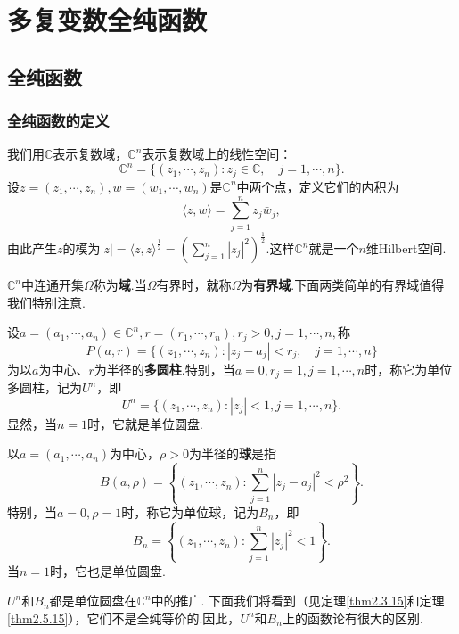 \chapter{多复变数全纯函数\label{chap1}}
\section{全纯函数\label{sec1.1}}
\subsection{全纯函数的定义}
我们用$\mathbb{C}$表示复数域，$\mathbb{C}^n$表示复数域上的线性空间：
\[\mathbb{C}^n=\{(z_1,\cdots,z_n)\colon z_j\in\mathbb{C},\quad j=1,\cdots,n\}.\]
设$z=(z_1,\cdots,z_n),w=(w_1,\cdots,w_n)$是$\mathbb{C}^n$中两个点，定义它们的内积为
\[\langle z,w \rangle =\sum_{j=1}^n z_j\bar{w}_j ,\]
由此产生$z$的模为$|z|=\langle z,z \rangle^{\frac12}=(\sum\limits_{j=1}^n |z_j|^2)^{\frac12}$.这样$\mathbb{C}^n$就是一个$n$维Hilbert空间.


$\mathbb{C}^n$中连通开集$\Omega$称为\textbf{域}.当$\Omega$有界时，就称$\Omega$为\textbf{有界域}.下面两类简单的有界域值得我们特别注意.


设$a=(a_1,\cdots,a_n)\in\mathbb{C}^n,r=(r_1,\cdots,r_n),r_j>0,j=1,\cdots,n,$称
\[P(a,r)=\{(z_1,\cdots,z_n)\colon |z_j-a_j|<r_j,\quad j=1,\cdots,n\}\]
为以$a$为中心、$r$为半径的\textbf{多圆柱}.特别，当$a=0,r_j=1,j=1,\cdots,n$时，称它为单位多圆柱，记为$U^n$，即
\[U^n=\{(z_1,\cdots,z_n)\colon |z_j|<1,j=1,\cdots,n\}.\]
显然，当$n=1$时，它就是单位圆盘.


以$a=(a_1,\cdots,a_n)$为中心，$\rho>0$为半径的\textbf{球}是指
\[B(a,\rho)=\left\{(z_1,\cdots,z_n)\colon\sum_{j=1}^{n}|z_j-a_j|^2 <\rho^2\right\}.\]
特别，当$a=0,\rho=1$时，称它为单位球，记为$B_n$，即
\[B_n=\left\{(z_1,\cdots,z_n)\colon \sum_{j=1}^n |z_j|^2 <1\right\}.\]
当$n=1$时，它也是单位圆盘.


$U^n$和$B_n$都是单位圆盘在$\mathbb{C}^n$中的推广. 下面我们将看到（见定理\ref{thm2.3.15}和定理\\
\ref{thm2.5.15}），它们不是全纯等价的.因此，$U^n$和$B_n$上的函数论有很大的区别.


